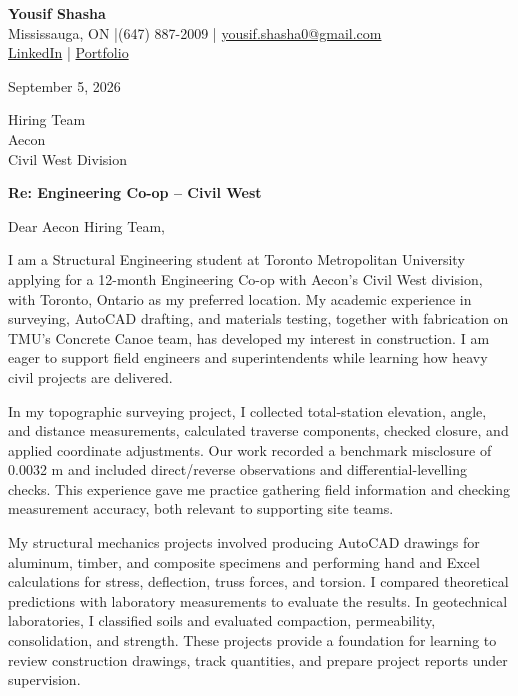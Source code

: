 \documentclass[11pt]{article}
\newcommand{\contact}[1]{{\small #1}}
\begin{document}
\begin{center}
{\LARGE \textbf{Yousif Shasha}}\\[4pt]
\contact{Mississauga, ON \enspace|\enspace (647) 887-2009 \enspace|\enspace
\href{mailto:yousif.shasha0@gmail.com}{yousif.shasha0@gmail.com}}\\[3pt]
\contact{\href{https://www.linkedin.com/in/yousif-shasha-177412375/}{LinkedIn}
\enspace|\enspace
\href{https://yousifshasha.github.io/Yousif-Shasha.github.io/}{Portfolio}}
\end{center}
\vspace{-4pt}

September 5, 2026

Hiring Team\\
Aecon\\
Civil West Division

\textbf{Re: Engineering Co-op -- Civil West}

Dear Aecon Hiring Team,

I am a Structural Engineering student at Toronto Metropolitan University applying for a 12-month Engineering Co-op with Aecon's Civil West division, with Toronto, Ontario as my preferred location. My academic experience in surveying, AutoCAD drafting, and materials testing, together with fabrication on TMU's Concrete Canoe team, has developed my interest in construction. I am eager to support field engineers and superintendents while learning how heavy civil projects are delivered.

In my topographic surveying project, I collected total-station elevation, angle, and distance measurements, calculated traverse components, checked closure, and applied coordinate adjustments. Our work recorded a benchmark misclosure of 0.0032 m and included direct/reverse observations and differential-levelling checks. This experience gave me practice gathering field information and checking measurement accuracy, both relevant to supporting site teams.

My structural mechanics projects involved producing AutoCAD drawings for aluminum, timber, and composite specimens and performing hand and Excel calculations for stress, deflection, truss forces, and torsion. I compared theoretical predictions with laboratory measurements to evaluate the results. In geotechnical laboratories, I classified soils and evaluated compaction, permeability, consolidation, and strength. These projects provide a foundation for learning to review construction drawings, track quantities, and prepare project reports under supervision.
\end{document}
